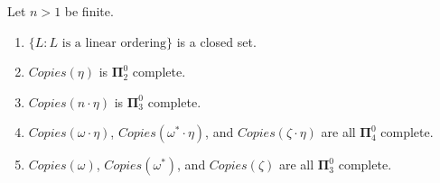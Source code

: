 \documentclass[11pt]{amsart}
\theoremstyle{definition}
\begin{document}
\begin{proposition} \label{Le1B} Let $n>1$ be finite.
\begin{enumerate}
\item $\{L: \text{$L$ is a linear ordering}\}$ is a closed set.
\item $Copies(\eta)$ is $\mathbf{\Pi}^0_2$ complete.
\item  $Copies(n \cdot \eta)$ is $\mathbf{\Pi}^0_3$ complete.
\item $Copies( \omega \cdot \eta )$,  $Copies( \omega^* \cdot \eta )$, and $Copies( \zeta \cdot \eta )$ are all $\mathbf{\Pi}^0_4$ complete.
\item $Copies(\omega)$, $Copies(\omega^*)$, and $Copies(\zeta)$ are all $\mathbf{\Pi}^0_3$ complete.
\end{enumerate}
\end{proposition}
\end{document}
